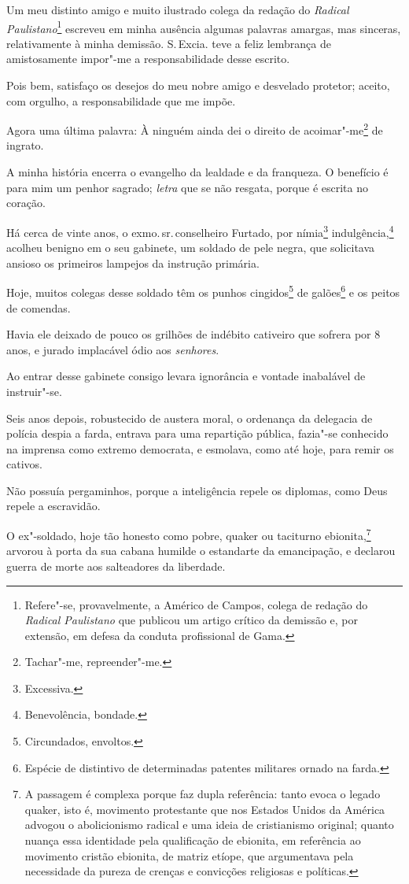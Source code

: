 Um meu distinto amigo e muito ilustrado colega da redação do
\emph{Radical Paulistano}\footnote{Refere"-se, provavelmente, a Américo
  de Campos, colega de redação do \emph{Radical Paulistano} que publicou
  um artigo crítico da demissão e, por extensão, em defesa da conduta
  profissional de Gama.} escreveu em minha ausência algumas palavras
amargas, mas sinceras, relativamente à minha demissão. S.\,Excia. teve a
feliz lembrança de amistosamente impor"-me a responsabilidade desse
escrito.

Pois bem, satisfaço os desejos do meu nobre amigo e desvelado protetor;
aceito, com orgulho, a responsabilidade que me impõe.

Agora uma última palavra:
À ninguém ainda dei o direito de acoimar"-me\footnote{Tachar"-me,
  repreender"-me.} de ingrato.

A minha história encerra o evangelho da lealdade e da franqueza. O
benefício é para mim um penhor sagrado; \emph{letra} que se não resgata,
porque é escrita no coração.

Há cerca de vinte anos, o exmo.\,sr.\,conselheiro Furtado, por
nímia\footnote{Excessiva.} indulgência,\footnote{Benevolência,
  bondade.} acolheu benigno em o seu gabinete, um soldado de pele
negra, que solicitava ansioso os primeiros lampejos da instrução
primária.

Hoje, muitos colegas desse soldado têm os punhos cingidos\footnote{
  Circundados, envoltos.} de galões\footnote{Espécie de distintivo de
  determinadas patentes militares ornado na farda.} e os peitos de
comendas.

Havia ele deixado de pouco os grilhões de indébito cativeiro que sofrera
por 8 anos, e jurado implacável ódio aos \emph{senhores}.

Ao entrar desse gabinete consigo levara ignorância e vontade inabalável
de instruir"-se.

Seis anos depois, robustecido de austera moral, o ordenança da delegacia
de polícia despia a farda, entrava para uma repartição pública, fazia"-se
conhecido na imprensa como extremo democrata, e esmolava, como até hoje,
para remir os cativos.

Não possuía pergaminhos, porque a inteligência repele os diplomas, como
Deus repele a escravidão.

O ex"-soldado, hoje tão honesto como pobre, quaker ou taciturno
ebionita,\footnote{A passagem é complexa porque faz dupla referência:
  tanto evoca o legado quaker, isto é, movimento protestante que nos
  Estados Unidos da América advogou o abolicionismo radical e uma ideia
  de cristianismo original; quanto nuança essa identidade pela
  qualificação de ebionita, em referência ao movimento cristão ebionita,
  de matriz etíope, que argumentava pela necessidade da pureza de
  crenças e convicções religiosas e políticas.} arvorou à porta da sua
cabana humilde o estandarte da emancipação, e declarou guerra de morte
aos salteadores da liberdade.

